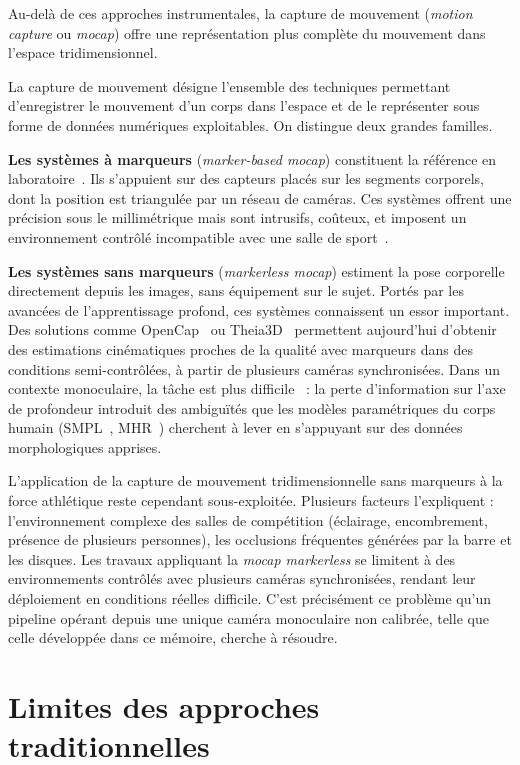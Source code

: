 Au-delà de ces approches instrumentales, la capture de mouvement (\textit{motion capture} ou \textit{mocap}) offre une représentation plus complète du mouvement dans l'espace tridimensionnel.

La capture de mouvement désigne l'ensemble des techniques permettant d'enregistrer le mouvement d'un corps dans l'espace et de le représenter sous forme de données numériques exploitables. On distingue deux grandes familles.

\textbf{Les systèmes à marqueurs} (\textit{marker-based mocap}) constituent la référence en laboratoire~\cite{Colwell2025}. Ils s'appuient sur des capteurs placés sur les segments corporels, dont la position est triangulée par un réseau de caméras. Ces systèmes offrent une précision sous le millimétrique mais sont intrusifs, coûteux, et imposent un environnement contrôlé incompatible avec une salle de sport~\cite{Tibrewal2024}.

\textbf{Les systèmes sans marqueurs} (\textit{markerless mocap}) estiment la pose  corporelle directement depuis les images, sans équipement sur le sujet. Portés par les avancées de l'apprentissage profond, ces systèmes connaissent un essor important. Des solutions comme OpenCap~\cite{Opencap-2026} ou Theia3D~\cite{Theia-3D-2026} permettent aujourd'hui d'obtenir des estimations cinématiques proches de la qualité avec marqueurs dans des conditions semi-contrôlées, à partir de plusieurs caméras synchronisées. Dans un contexte monoculaire, la tâche est plus difficile~\cite{Wade2022} : la perte d'information sur l'axe de profondeur introduit des ambiguïtés que les modèles paramétriques du corps humain (SMPL~\cite{SMPL-2015}, MHR~\cite{MHR-2025}) cherchent à lever en s'appuyant sur des données morphologiques apprises.

L'application de la capture de mouvement tridimensionnelle sans marqueurs à la force athlétique reste cependant sous-exploitée. Plusieurs facteurs l'expliquent : l'environnement complexe des salles de compétition (éclairage, encombrement, présence de plusieurs personnes), les occlusions fréquentes générées par la barre et les disques. Les travaux appliquant la \textit{mocap markerless} se limitent à des environnements contrôlés avec plusieurs caméras synchronisées, rendant leur déploiement en conditions réelles difficile. C'est précisément ce problème qu'un pipeline opérant depuis une unique caméra monoculaire non calibrée, telle que celle développée dans ce mémoire, cherche à résoudre.

\section{Limites des approches traditionnelles}

